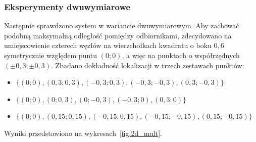 \subsubsection{Eksperymenty dwuwymiarowe}

Następnie sprawdzono system w wariancie dwuwymiarowym. Aby zachować podobną maksymalną odległość pomiędzy odbiornikami, zdecydowano na umiejscowienie czterech węzłów na wierzchołkach kwadratu o boku $0,6$ symetrycznie względem puntu $(0;0)$, a więc na punktach o współrzędnych $(\pm0,3; \pm0,3)$. Zbadano dokładność lokalizacji w trzech zestawach punktów:

\begin{itemize}
    \item $\{(0;0), (0,3;0,3), (-0,3;0,3), (-0,3;-0,3), (0,3;-0,3)\}$
    \item $\{(0;0), (0;0,3), (0;-0,3), (-0,3;0), (0,3;0)\}$
    \item $\{(0;0), (0,15;0,15), (-0,15;0,15), (-0,15;-0,15), (0,15;-0,15)\}$
\end{itemize}
Wyniki przedstawiono na wykresach~\ref{fig:2d_mult}.

